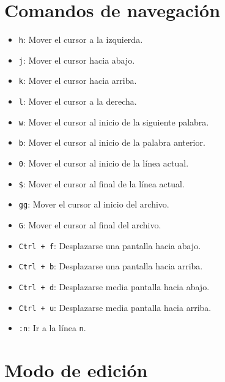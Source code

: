 \documentclass{article}[12pt,a4paper,twoside,utf8,spanish]
\theoremstyle{mytheoremstyle}
\theoremstyle{mytheoremstyle}
\theoremstyle{myproblemstyle}
\begin{document}
    \begin{multicols}{2}
    \section{Comandos de navegación}
    \begin{itemize}
        \item \texttt{h}: Mover el cursor a la izquierda.
        \item \texttt{j}: Mover el cursor hacia abajo.
        \item \texttt{k}: Mover el cursor hacia arriba.
        \item \texttt{l}: Mover el cursor a la derecha.
        \item \texttt{w}: Mover el cursor al inicio de la siguiente palabra.
        \item \texttt{b}: Mover el cursor al inicio de la palabra anterior.
        \item \texttt{0}: Mover el cursor al inicio de la línea actual.
        \item \texttt{\$}: Mover el cursor al final de la línea actual.
        \item \texttt{gg}: Mover el cursor al inicio del archivo.
        \item \texttt{G}: Mover el cursor al final del archivo.
        \item \texttt{Ctrl + f}: Desplazarse una pantalla hacia abajo.
        \item \texttt{Ctrl + b}: Desplazarse una pantalla hacia arriba. 
        \item \texttt{Ctrl + d}: Desplazarse media pantalla hacia abajo.
        \item \texttt{Ctrl + u}: Desplazarse media pantalla hacia arriba.
        \item \texttt{:n}: Ir a la línea \texttt{n}. 
    \end{itemize}
    \section{Modo de edición} 


\end{multicols}
\end{document}
